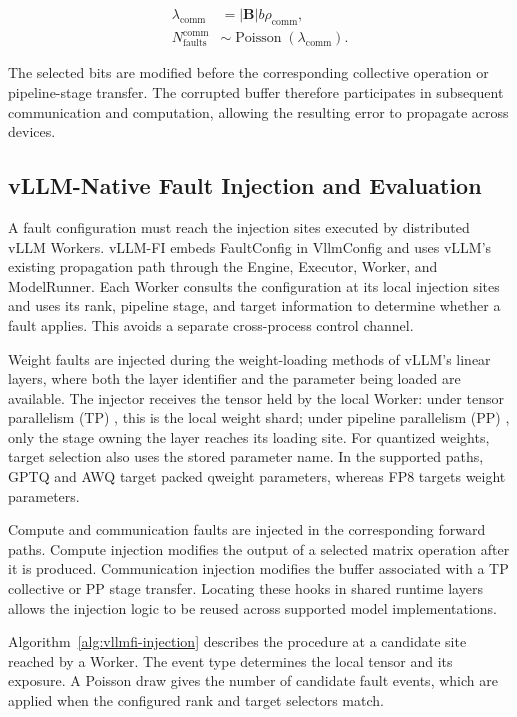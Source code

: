 \begin{align}
    \lambda_{\mathrm{comm}}
    &= |\mathbf{B}|b\rho_{\mathrm{comm}},
    \label{eq:comm_exposure}\\
    N_{\mathrm{faults}}^{\mathrm{comm}}
    &\sim \operatorname{Poisson}(\lambda_{\mathrm{comm}}).
    \label{eq:comm_poisson}
\end{align}

The selected bits are modified before the corresponding collective operation or pipeline-stage transfer. The corrupted buffer therefore participates in subsequent communication and computation, allowing the resulting error to propagate across devices.


\subsection{vLLM-Native Fault Injection and Evaluation}
\label{subsec:runtime_injection}

A fault configuration must reach the injection sites executed by distributed vLLM Workers. vLLM-FI embeds FaultConfig in VllmConfig and uses vLLM's existing propagation path through the Engine, Executor, Worker, and ModelRunner. Each Worker consults the configuration at its local injection sites and uses its rank, pipeline stage, and target information to determine whether a fault applies. This avoids a separate cross-process control channel.

Weight faults are injected during the weight-loading methods of vLLM's linear layers, where both the layer identifier and the parameter being loaded are available. The injector receives the tensor held by the local Worker: under tensor parallelism (TP) \cite{shoeybi2019megatron}, this is the local weight shard; under pipeline parallelism (PP) \cite{huang2019gpipe}, only the stage owning the layer reaches its loading site. For quantized weights, target selection also uses the stored parameter name. In the supported paths, GPTQ and AWQ target packed qweight parameters, whereas FP8 targets weight parameters.

Compute and communication faults are injected in the corresponding forward paths. Compute injection modifies the output of a selected matrix operation after it is produced. Communication injection modifies the buffer associated with a TP collective or PP stage transfer. Locating these hooks in shared runtime layers allows the injection logic to be reused across supported model implementations.

Algorithm~\ref{alg:vllmfi-injection} describes the procedure at a candidate site reached by a Worker. The event type determines the local tensor and its exposure. A Poisson draw gives the number of candidate fault events, which are applied when the configured rank and target selectors match.

